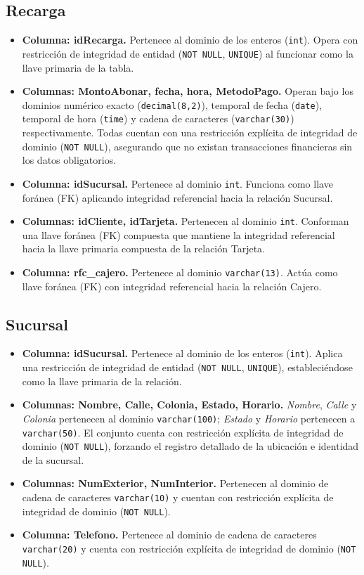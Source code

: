 \documentclass[11pt,letterpaper,spanish]{article}
\begin{document}
\subsection*{Recarga}
\begin{itemize}
	\item \textbf{Columna: idRecarga.} Pertenece al dominio de los enteros (\texttt{int}). Opera con restricción de integridad de entidad (\texttt{NOT NULL}, \texttt{UNIQUE}) al funcionar como la llave primaria de la tabla.
	\item \textbf{Columnas: MontoAbonar, fecha, hora, MetodoPago.} Operan bajo los dominios numérico exacto (\texttt{decimal(8,2)}), temporal de fecha (\texttt{date}), temporal de hora (\texttt{time}) y cadena de caracteres (\texttt{varchar(30)}) respectivamente. Todas cuentan con una restricción explícita de integridad de dominio (\texttt{NOT NULL}), asegurando que no existan transacciones financieras sin los datos obligatorios.
	\item \textbf{Columna: idSucursal.} Pertenece al dominio \texttt{int}. Funciona como llave foránea (FK) aplicando integridad referencial hacia la relación Sucursal.
	\item \textbf{Columnas: idCliente, idTarjeta.} Pertenecen al dominio \texttt{int}. Conforman una llave foránea (FK) compuesta que mantiene la integridad referencial hacia la llave primaria compuesta de la relación Tarjeta.
	\item \textbf{Columna: rfc\_cajero.} Pertenece al dominio \texttt{varchar(13)}. Actúa como llave foránea (FK) con integridad referencial hacia la relación Cajero.
\end{itemize}

\subsection*{Sucursal}
\begin{itemize}
	\item \textbf{Columna: idSucursal.} Pertenece al dominio de los enteros (\texttt{int}). Aplica una restricción de integridad de entidad (\texttt{NOT NULL}, \texttt{UNIQUE}), estableciéndose como la llave primaria de la relación.
	\item \textbf{Columnas: Nombre, Calle, Colonia, Estado, Horario.} \textit{Nombre}, \textit{Calle} y \textit{Colonia} pertenecen al dominio \texttt{varchar(100)}; \textit{Estado} y \textit{Horario} pertenecen a \texttt{varchar(50)}. El conjunto cuenta con restricción explícita de integridad de dominio (\texttt{NOT NULL}), forzando el registro detallado de la ubicación e identidad de la sucursal.
	\item \textbf{Columnas: NumExterior, NumInterior.} Pertenecen al dominio de cadena de caracteres \texttt{varchar(10)} y cuentan con restricción explícita de integridad de dominio (\texttt{NOT NULL}).
	\item \textbf{Columna: Telefono.} Pertenece al dominio de cadena de caracteres \texttt{varchar(20)} y cuenta con restricción explícita de integridad de dominio (\texttt{NOT NULL}).
\end{itemize}
\end{document}
